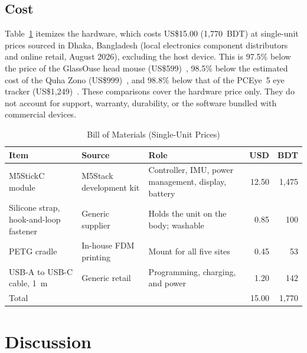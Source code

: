\documentclass[journal]{IEEEtran}
\begin{document}
\subsection{Cost}
Table~\ref{tab:bom} itemizes the hardware, which costs US\$15.00 (1,770~BDT) at single-unit prices sourced in Dhaka, Bangladesh (local electronics component distributors and online retail, August 2026), excluding the host device. This is 97.5\% below the price of the GlassOuse head mouse (US\$599)~\cite{glassouse}, 98.5\% below the estimated cost of the Quha Zono (US\$999)~\cite{montechquha}, and 98.8\% below that of the PCEye~5 eye tracker (US\$1,249)~\cite{montechpceye}. These comparisons cover the hardware price only. They do not account for support, warranty, durability, or the software bundled with commercial devices.

\begin{table}[!t]
\caption{Bill of Materials (Single-Unit Prices)}
\label{tab:bom}
\centering
\footnotesize
\setlength{\tabcolsep}{3pt}
\begin{tabular}{@{}>{\raggedright\arraybackslash}p{2.0cm}>{\raggedright\arraybackslash}p{1.75cm}>{\raggedright\arraybackslash}p{2.35cm}rr@{}}
\toprule
Item & Source & Role & USD & BDT \\
\midrule
M5StickC module & M5Stack development kit & Controller, IMU, power management, display, battery & 12.50 & 1,475 \\
Silicone strap, hook-and-loop fastener & Generic supplier & Holds the unit on the body; washable & 0.85 & 100 \\
PETG cradle & In-house FDM printing & Mount for all five sites & 0.45 & 53 \\
USB-A to USB-C cable, 1~m & Generic retail & Programming, charging, and power & 1.20 & 142 \\
\midrule
Total & & & 15.00 & 1,770 \\
\bottomrule
\end{tabular}
\end{table}

\section{Discussion}
\label{sec:discussion}
\end{document}
